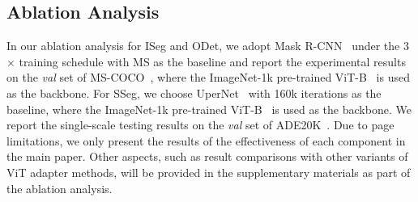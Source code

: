 \subsection{Ablation Analysis}
\label{sec4:4}
In our ablation analysis for ISeg and ODet,
we adopt Mask R-CNN~\citep{he2017mask} under the 3$\times$ training schedule with MS as the baseline and report the experimental results on the \emph{val} set of MS-COCO~\citep{caesar2018coco}, where the ImageNet-1k pre-trained ViT-B~\citep{li2022exploring} is used as the backbone. For SSeg, we choose UperNet~\citep{xiao2018unified} with 160k iterations as the baseline, where the ImageNet-1k pre-trained ViT-B~\citep{li2022exploring} is used as the backbone. We report the single-scale testing results on the \emph{val} set of ADE20K~\citep{zhou2017scene}.
Due to page limitations, we only present the results of the effectiveness of each component in the main paper. Other aspects, such as result comparisons with other variants of ViT adapter methods, will be provided in the supplementary materials as part of the ablation analysis.

